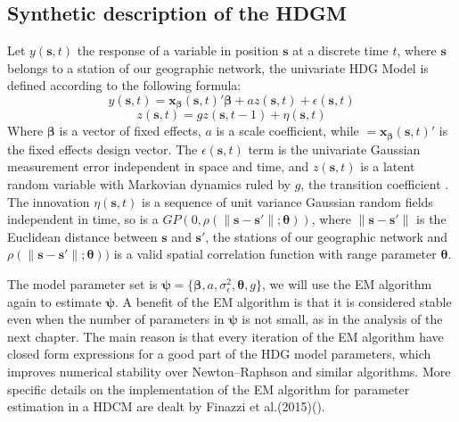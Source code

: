 \subsection{Synthetic description of the HDGM}
Let $y(\pmb{s},t)$  the response of a variable in position $\pmb{s}$ at a discrete time $t$, where $\pmb{s}$ belongs to a station of our geographic network, the univariate HDG Model is defined according to the following formula:
\begin{displaymath}{y(\pmb{s},t)=\pmb{x_\beta}(\pmb{s},t)'\pmb{\beta}+az(\pmb{s},t)+\epsilon(\pmb{s},t)}\end{displaymath}
\begin{displaymath}{z(\pmb{s},t)=gz(\pmb{s},t-1)+\eta(\pmb{s},t)}\end{displaymath}
Where $\pmb{\beta}$ is a vector of fixed effects, $a$ is a scale coefficient, while $=\pmb{x_\beta}(\pmb{s},t)'$ is the fixed effects design vector. The $\epsilon(\pmb{s},t)$   term is the univariate Gaussian measurement error independent in space and time, and $z(\pmb{s},t)$ is a latent random variable with Markovian dynamics ruled by $g$, the transition coefficient . The innovation $\eta(\pmb{s},t)$ is a sequence of unit variance Gaussian random fields independent in time, so is a $GP(0,\rho(\lVert \pmb{s}-\pmb{s'} \rVert;\pmb{\theta}))$, where $\lVert \pmb{s}-\pmb{s'} \rVert$ is the Euclidean distance between $\pmb{s}$ and $\pmb{s'}$, the stations of our geographic network and $\rho(\lVert \pmb{s}-\pmb{s'} \rVert;\pmb{\theta}))$ is a valid spatial correlation function with range parameter $\pmb{\theta}$. 

The model parameter set is $\pmb{\psi}=\{\pmb{\beta},a,\sigma_\epsilon^2,\pmb{\theta},g\}$, we will use the EM algorithm again to estimate $\pmb{\psi}$. A benefit of the EM algorithm is that it is considered stable even when the number of parameters in $\pmb{\psi}$ is not small, as in the analysis of the next chapter. The main reason is that every iteration of the EM algorithm have closed form expressions for a good part of the HDG model parameters, which improves numerical stability over Newton–Raphson and similar algorithms. More specific details on the implementation of the EM algorithm for parameter estimation in a HDCM are dealt by Finazzi et al.(2015)(\cite{hdgm}).

